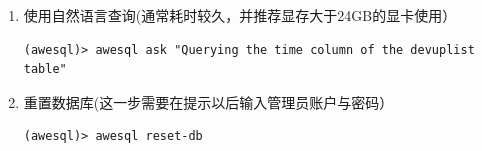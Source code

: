 \begin{CJK*}{UTF8}{song}
\begin{enumerate}
    \begin{lstlisting}
(awesql)> awesql run "
SELECT STRFTIME('%Y-%m-%d', d.time) AS date, l.area, COUNT(d.did) AS update_count
FROM devupdata d JOIN devlist l ON d.did = l.did 
WHERE l.area IS NOT NULL AND STRFTIME('%Y-%m-%d', d.time) > '2021-01-01' 
GROUP BY date, l.area ORDER BY date;"        
    \end{lstlisting}
        \item 使用自然语言查询(通常耗时较久，并推荐显存大于24GB的显卡使用）
    \begin{lstlisting}
(awesql)> awesql ask "Querying the time column of the devuplist table"
    \end{lstlisting}
        \item 重置数据库(这一步需要在提示以后输入管理员账户与密码）
    \begin{lstlisting}
(awesql)> awesql reset-db
    \end{lstlisting}
\end{enumerate}



\end{CJK*}